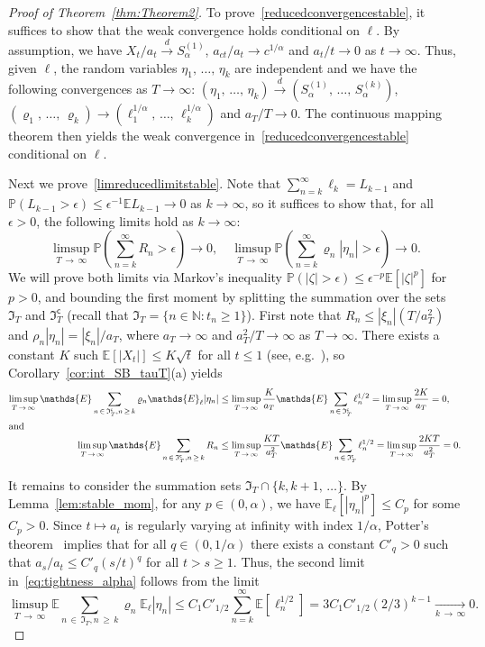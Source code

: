 \documentclass[AHL,Unicode,longabstracts,published]{cedram}
\newcommand\N{\mathbb{N}}
\newcommand\E{\mathds{E}}
\newcommand\p{\mathds{P}}
\newcommand\1{\mathds{1}}
\newcommand\GI{\mathfrak{I}}
\newcommand\co{\mathsf{c}}
\newcommand\cid{\xrightarrow{d}}
\begin{document}
\begin{proof}[Proof of Theorem~\ref{thm:Theorem2}]
To prove~\eqref{reducedconvergencestable}, it suffices to show that the weak convergence holds conditional on $\ell$. By assumption, we have $X_t/a_t\cid S_\alpha^{(1)}$, $a_{ct}/a_t\to c^{1/\alpha}$ and $a_t/t\to 0$ as $t\to\infty$. Thus, given $\ell$, the random variables $\eta_1,\,\ldots,\,\eta_k$ are independent and we have the following convergences as $T\to\infty$: $(\eta_1,\,\ldots,\,\eta_k) \cid (S_\alpha^{(1)},\,\ldots,\,S_\alpha^{(k)})$, $(\varrho_1,\,\ldots,\,\varrho_k) \to(\ell_1^{1/\alpha},\,\ldots,\,\ell_k^{1/\alpha})$ and $a_T/T\to 0$. The continuous mapping theorem then yields the weak convergence in~\eqref{reducedconvergencestable} conditional on $\ell$.

Next we prove~\eqref{limreducedlimitstable}. Note that $\sum_{n=k}^\infty \ell_k=L_{k-1}$ and $\p(L_{k-1}>\epsilon)\le \epsilon^{-1}\E L_{k-1}\to 0$ as $k\to\infty$, so it suffices to show that, for all $\epsilon>0$, the following limits hold as $k\to\infty$:
\begin{equation}\label{eq:tightness_alpha}
\limsup_{T\,\to\,\infty}
\p\left(\sum_{n=k}^\infty R_n >\epsilon\right)
\to0,
\quad
\limsup_{T\,\to\,\infty}
\p\left(\sum_{n=k}^\infty\varrho_n|\eta_n| >\epsilon\right)
\to0.
\end{equation}
We will prove both limits via Markov's inequality $\p(|\zeta|>\epsilon)\le \epsilon^{-p}\E[|\zeta|^p]$ for $p>0$, and bounding the first moment by splitting the summation over the sets $\GI_T$ and $\GI_T^\co$ (recall that $\GI_T=\{n\in\N:t_n\ge 1\}$). First note that $R_n\le |\xi_n|(T/a_T^2)$ and $\rho_n|\eta_n|=|\xi_n|/a_T$, where $a_T\to\infty$ and $a_T^2/T\to\infty$ as $T\to\infty$. There exists a constant $K$ such $\E[|X_t|]\le K\sqrt{t}$ for all $t\le1$ (see, e.g.~\cite[Lemma~2]{LevySupSim}), so Corollary~\ref{cor:int_SB_tauT}(a) yields
\begin{align*}
\limsup_{T\,\to\,\infty}
\E\sum_{n\,\in\,\GI_T^\co, n\,\ge\,k}
\varrho_n\E_\ell|\eta_n|
&\le \limsup_{T\,\to\,\infty}
\frac{K}{a_T}\E\sum_{n\,\in\,\GI_T^\co} \ell_n^{1/2} =\limsup_{T\,\to\,\infty}\frac{2K}{a_T}=0,\\
\intertext{and}
\limsup_{T\,\to\,\infty}
\E\sum_{n\,\in\,\GI_T^\co, n\,\ge\,k}R_n
&\le \limsup_{T\,\to\,\infty}
\frac{KT}{a_T^2}\E\sum_{n\,\in\,\GI_T^\co} \ell_n^{1/2} =\limsup_{T\,\to\,\infty}\frac{2KT}{a_T^2}=0.
\end{align*}

It remains to consider the summation sets $\GI_T\cap\{k,k+1,\,\ldots\}$. By Lemma~\ref{lem:stable_mom}, for any $p\in(0,\alpha)$, we have $\E_\ell[|\eta_n|^p]\le C_p$ for some $C_p>0$. Since $t\mapsto a_t$ is regularly varying at infinity with index $1/\alpha$, Potter's theorem~\cite[Theorem~1.5.6]{BinghamBook} implies that for all $q\in(0,1/\alpha)$ there exists a constant $C'_{q}>0$ such that $a_s/a_t\le C'_{q}(s/t)^{q}$ for all $t>s\ge 1$. Thus, the second limit in~\eqref{eq:tightness_alpha} follows from the limit
\[
\limsup_{T\,\to\,\infty}
\E\sum_{n\,\in\,\GI_T, n\,\ge\,k}
\varrho_n\E_\ell|\eta_n|
\le C_1C'_{1/2}
\sum_{n=k}^\infty \E\left[\ell_n^{1/2}\right] =3C_1C'_{1/2}(2/3)^{k-1}
\xrightarrow[k\,\to\,\infty]{}0.
\]


\end{proof}
\end{document}
